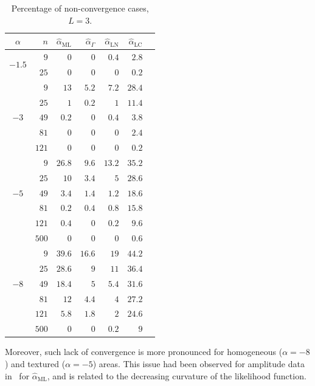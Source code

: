 \documentclass[twocolumn]{svjour3}
\begin{document}
\begin{table}[hbt]
	\caption{Percentage of non-convergence cases,  $L=3$.}
	\centering
	\label{NoConvMLyNGyLNyLC_L=3}
	\begin{tabular}{c*6{r}}
		\toprule        
		$\alpha$ & $n$ & $\widehat{\alpha}_{\text{{ML}}}$ & $\widehat{\alpha}_{\Gamma}$ & $\widehat{\alpha}_{\text{{LN}}}$ &  $\widehat{\alpha}_{\text{{LC}}}$\\
		\midrule
		\multirow{2 }{*}{$-1.5$} 
		&   $9$ & $0$ & $0$ & $0.4$ &  $2.8$\\
		&  $25$ & $0$ & $0$ & $0$ & $0.2$\\
		\midrule
		\multirow{5 }{*}{$-3$} 
		&   $9$ & $13$    & $5.2$  & $7.2$  &  $28.4$\\ 
		&  $25$ & $1$     & $0.2$  & $1$    &  $11.4$\\
		&  $49$ & $0.2$   & $0$    & $0.4$  & $3.8$\\ 
		&  $81$ & $0$     & $0$    & $0$    & $2.4$\\ 
		& $121$ & $0$     & $0$    & $0$    & $0.2$\\ 
		\midrule
		\multirow{5 }{*}{$-5$} 
		&   $9$ & $26.8$  & $9.6$  & $13.2$ &  $35.2$\\ 
		&  $25$ & $10$    & $3.4$  & $5$    & $28.6$\\ 
		&  $49$ & $3.4$   & $1.4$  & $1.2$  & $18.6$\\ 
		&  $81$ & $0.2$   & $0.4$  & $0.8$  & $15.8$\\ 
		& $121$ & $0.4$   & $0$    & $0.2$  & $9.6$\\ 
		& $500$ & $0$     & $0$    & $0$    & $0.6$\\ 
		\midrule
		\multirow{5 }{*}{$-8$} 
		&   $9$  & $39.6$ & $16.6$ & $19$   & $44.2$\\ 
		&  $25$  & $28.6$ & $9$    & $11$   & $36.4$\\ 
		&  $49$  & $18.4$ & $5$    & $5.4$  & $31.6$\\ 
		&  $81$  & $12$   & $4.4$  & $4$    & $27.2$\\ 
		& $121$  & $5.8$  & $1.8$  & $2$    & $24.6$\\ 
		& $500$  & $0$    & $0$    & $0.2$  & $9$\\
		\bottomrule     
	\end{tabular}
\end{table}    

Moreover, such lack of convergence is more pronounced for homogeneous ($\alpha=-8$) and textured ($\alpha=-5$) areas. 
This issue had been observed for amplitude data in~\cite{FreryCribariSouza:JASP:04} for $\widehat{\alpha}_{\text{{ML}}}$, and is related to the decreasing curvature of the likelihood function.
\end{document}
